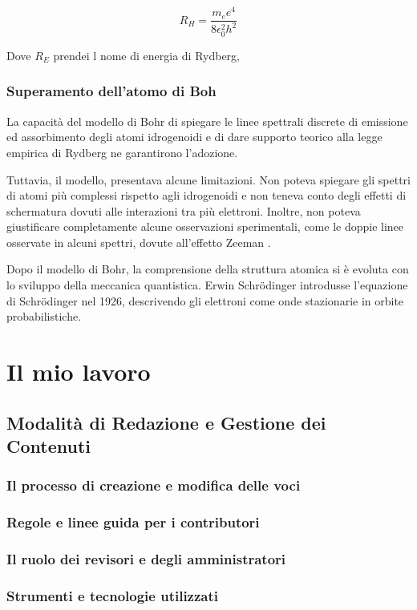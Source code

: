 \documentclass[12pt,a4paper]{report}
\begin{document}
\[ R_H = \frac{m_e e^4}{8 \epsilon_0^2 h^2} \]

Dove \(R_E\) prendei l nome di energia di Rydberg,

\subsection{Superamento dell'atomo di Boh}

La capacità del modello di Bohr di spiegare le linee spettrali discrete di emissione ed assorbimento degli atomi idrogenoidi e di dare supporto teorico alla legge empirica di Rydberg ne garantirono l'adozione.

Tuttavia, il modello, presentava alcune limitazioni. Non poteva spiegare gli spettri di atomi più complessi rispetto agli idrogenoidi e non teneva conto degli effetti di schermatura dovuti alle interazioni tra più elettroni. Inoltre, non poteva giustificare completamente alcune osservazioni sperimentali, come le doppie linee osservate in alcuni spettri, dovute all'effetto Zeeman \cite{ZeemanEffect}.

Dopo il modello di Bohr, la comprensione della struttura atomica si è evoluta con lo sviluppo della meccanica quantistica. Erwin Schrödinger introdusse l'equazione di Schrödinger nel 1926, descrivendo gli elettroni come onde stazionarie in orbite probabilistiche.

\chapter{Il mio lavoro}
\section{Modalità di Redazione e Gestione dei Contenuti}
\subsection{Il processo di creazione e modifica delle voci}
\subsection{Regole e linee guida per i contributori}
\subsection{Il ruolo dei revisori e degli amministratori}
\subsection{Strumenti e tecnologie utilizzati}

\newpage

\printbibliography
\end{document}
